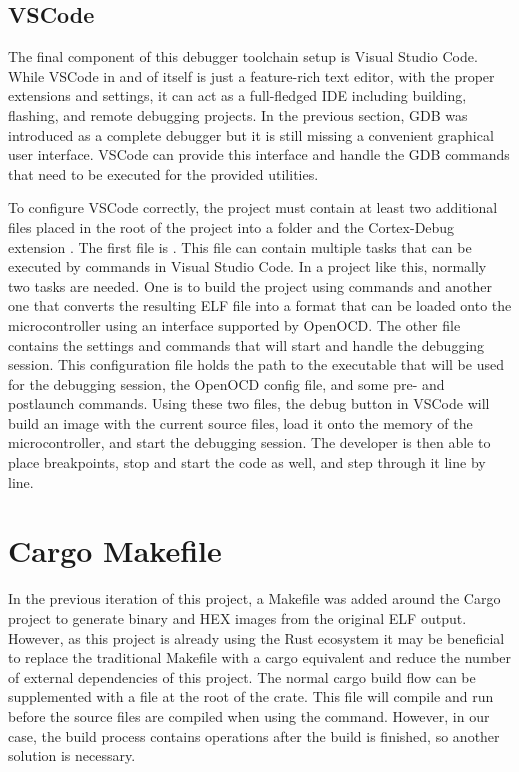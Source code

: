 \subsection{VSCode}

The final component of this debugger toolchain setup is Visual Studio Code. While VSCode in and of itself is just a feature-rich text editor, with the proper extensions and settings, it can act as a full-fledged IDE including building, flashing, and remote debugging projects. In the previous section, GDB was introduced as a complete debugger but it is still missing a convenient graphical user interface. VSCode can provide this interface and handle the GDB commands that need to be executed for the provided utilities.

To configure VSCode correctly, the project must contain at least two additional files placed in the root of the project into a  folder and the Cortex-Debug extension \cite{CortexDebug}. The first file is . This file can contain multiple tasks that can be executed by commands in Visual Studio Code. In a project like this, normally two tasks are needed. One is to build the project using  commands and another one that converts the resulting ELF file into a format that can be loaded onto the microcontroller using an interface supported by OpenOCD. The other file  contains the settings and commands that will start and handle the debugging session. This configuration file holds the path to the executable that will be used for the debugging session, the OpenOCD config file, and some pre- and postlaunch commands. Using these two files, the debug button in VSCode will build an image with the current source files, load it onto the memory of the microcontroller, and start the debugging session. The developer is then able to place breakpoints, stop and start the code as well, and step through it line by line.

\section{Cargo Makefile}

In the previous iteration of this project, a Makefile was added around the Cargo project to generate binary and HEX images from the original ELF output. However, as this project is already using the Rust ecosystem it may be beneficial to replace the traditional Makefile with a cargo equivalent and reduce the number of external dependencies of this project. The normal cargo build flow can be supplemented with a  file at the root of the crate. This file will compile and run before the source files are compiled when using the  command. However, in our case, the build process contains operations after the build is finished, so another solution is necessary.

